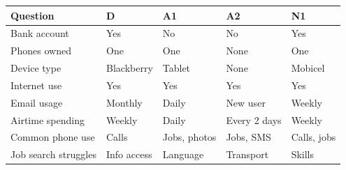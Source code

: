 \begin{tabularx}{\textwidth}{|p{3.8cm}|X|X|X|X|}
\hline
\rowcolor{gray!30}
\textbf{Question} & \textbf{D} & \textbf{A1} & \textbf{A2} & \textbf{N1} \\
\hline

Bank account & Yes & No & No & Yes \\
\hline

Phones owned & One & One & None & One \\
\hline

Device type & Blackberry & Tablet & None & Mobicel \\
\hline

Internet use & Yes & Yes & Yes & Yes \\
\hline

Email usage & Monthly & Daily & New user & Weekly \\
\hline

Airtime spending & Weekly & Daily & Every 2 days & Weekly \\
\hline

Common phone use & Calls & Jobs, photos & Jobs, SMS & Calls, jobs \\
\hline

Job search struggles & Info access & Language & Transport & Skills \\
\hline

\end{tabularx}





